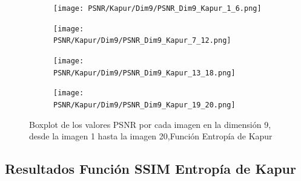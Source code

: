 \documentclass[conference]{IEEEtran}
\begin{document}
\begin{figure}[htbp]
	\centering
	\begin{subfigure}{0.4\textwidth}
		\texttt{[image: PSNR/Kapur/Dim9/PSNR\_Dim9\_Kapur\_1\_6.png]}
	\end{subfigure}
	
	\begin{subfigure}{0.4\textwidth}
		\texttt{[image: PSNR/Kapur/Dim9/PSNR\_Dim9\_Kapur\_7\_12.png]}
	\end{subfigure}
	\begin{subfigure}{0.4\textwidth}
		\texttt{[image: PSNR/Kapur/Dim9/PSNR\_Dim9\_Kapur\_13\_18.png]}
	\end{subfigure}   
	\begin{subfigure}{0.4\textwidth}
		\texttt{[image: PSNR/Kapur/Dim9/PSNR\_Dim9\_Kapur\_19\_20.png]}
		\vspace{-120pt} %
	\end{subfigure}
	\caption{Boxplot de los valores PSNR por cada imagen en la dimensión 9, desde la imagen 1 hasta la imagen 20,Función Entropía de Kapur}
	\label{fig:imagenes}    
\end{figure}
\subsection{Resultados Función SSIM Entropía de Kapur}
\end{document}
